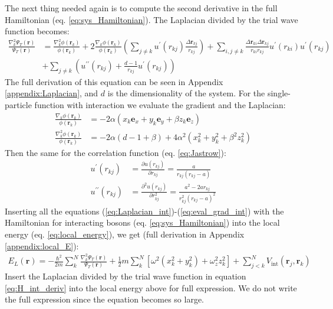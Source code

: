 \documentclass[12pt,a4paper,english]{article}
\begin{document}
The next thing needed again is to compute the second derivative in the full Hamiltonian (eq. \ref{eq:sys_Hamiltonian}). The Laplacian divided by the trial wave function becomes:
\begin{align}
\label{eq:Laplacian_int}
\frac{\nabla_k^2\Psi_T(\textbf{r})}{\Psi_T(\textbf{r})}&= \frac{\nabla_k^2\phi(\textbf{r}_k)}{\phi(\textbf{r}_k)}+2\frac{\nabla_k\phi(\textbf{r}_k)}{\phi(\textbf{r}_k)}\left(\sum_{j\neq k}u^{\prime}(r_{kj})\frac{\Delta\textbf{r}_{kj}}{r_{kj}}\right)+\sum_{i,j\neq k}\frac{\Delta \textbf{r}_{ki}\Delta \textbf{r}_{kj}}{r_{ki}r_{kj}}u^{\prime}(r_{ki})u^{\prime}(r_{kj})\nonumber\\
&+\sum_{j\neq k}\left(u^{\prime\prime}(r_{kj})+\frac{d-1}{r_{kj}}u^{\prime}(r_{kj})\right)
\end{align}
The full derivation of this equation can be seen in Appendix \ref{appendix:Laplacian}, and $d$ is the dimensionality of the system. For the single-particle function with interaction we evaluate the gradient and the Laplacian:
\begin{align}
\label{eq:eval_grad_one}
\frac{\nabla_k\phi(\textbf{r}_k)}{\phi(\textbf{r}_k)}&=-2\alpha(x_k\textbf{e}_x+y_k\textbf{e}_y+\beta z_k\textbf{e}_z)\\
\label{eq:eval_laplacian_one}
\frac{\nabla_k^2\phi(\textbf{r}_k)}{\phi(\textbf{r}_k)}&=-2\alpha(d-1+\beta)+4\alpha^2(x_k^2+y_k^2+\beta^2z_k^2)
\end{align}
Then the same for the correlation function (eq. \ref{eq:Jastrow}):
\begin{align}
\label{eq:eval_grad_int}
u^{\prime}(r_{kj})&=\frac{\partial u(r_{kj})}{\partial r_{kj}}=\frac{a}{r_{kj}(r_{kj}-a)}\\
\label{eq:eval_laplacian_int}
u^{\prime\prime}(r_{kj})&=\frac{\partial^2 u(r_{kj})}{\partial r_{kj}^2}=\frac{a^2-2ar_{kj}}{r_{kj}^2(r_{kj}-a)^2}
\end{align}
Inserting all the equations (\ref{eq:Laplacian_int})-(\ref{eq:eval_grad_int}) with the Hamiltonian for interacting bosons (eq. \ref{eq:sys_Hamiltonian}) into the local energy (eq. \ref{eq:local_energy}), we get (full derivation in Appendix \ref{appendix:local_E}):
\begin{align}
\label{eq:local_E_full}
E_L(\textbf{r})=-\frac{\hbar^2}{2m}\sum_k^N\frac{\nabla_k^2\Psi_T(\textbf{r})}{\Psi_T(\textbf{r})}
+\frac{1}{2}m\sum_k^N[\omega^2(x_k^2+y_k^2) + \omega_z^2z_k^2]
+\sum_{j<k}^{N}V_{\text{int}}(\textbf{r}_j,\textbf{r}_k)
\end{align}
Insert the Laplacian divided by the trial wave function in equation \ref{eq:H_int_deriv} into the local energy above for full expression. We do not write the full expression since the equation becomes so large.
\end{document}
